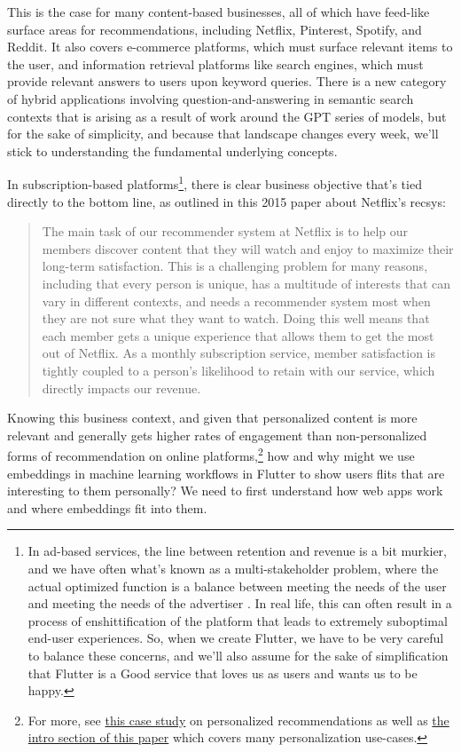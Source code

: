 \documentclass[11pt, table]{diazessay} %
\begin{document}
\begin{sloppypar}
This is the case for many content-based businesses, all of which have feed-like surface areas for recommendations, including Netflix, Pinterest, Spotify, and Reddit.  It also covers e-commerce platforms, which must surface relevant items to the user, and information retrieval platforms like search engines, which must provide relevant answers to users upon keyword queries. There is a new category of hybrid applications involving question-and-answering in semantic search contexts that is arising as a result of work around the GPT series of models, but for the sake of simplicity, and because that landscape changes every week, we'll stick to understanding the fundamental underlying concepts.

In subscription-based platforms\footnote{In ad-based services, the line between retention and revenue is a bit murkier, and we have often what's known as a multi-stakeholder problem, where the actual optimized function is a balance between meeting the needs of the user and meeting the needs of the advertiser \citep{zheng2017multi}.  In real life, this can often result in a process of enshittification \citep{doctorow_2023} of the platform that leads to extremely suboptimal end-user experiences. So, when we create Flutter, we have to be very careful to balance these concerns, and we'll also assume for the sake of simplification that Flutter is a Good service that loves us as users and wants us to be happy.}, there is clear business objective that's tied directly to the bottom line, as outlined in this 2015 paper  \citep{steck2021deep}  about Netflix's recsys:

\begin{quote}

The main task of our recommender system at Netflix is to help our members discover content that they will watch and enjoy to maximize their long-term satisfaction. This is a challenging problem for many reasons, including that every person is unique, has a multitude of interests that can vary in different contexts, and needs a recommender system most when they are not sure what they want to watch. Doing this well means that each member gets a unique experience that allows them to get the most out of Netflix. As a monthly subscription service, member satisfaction is tightly coupled to a person’s likelihood to retain with our service, which directly impacts our revenue.
\end{quote}

Knowing this business context, and given that personalized content is more relevant and generally gets higher rates of engagement \citep{jannach2010recommender} than non-personalized forms of recommendation on online platforms,\footnote{For more, see  \href{http://www.recommenderbook.net/media/Recommender_Systems_An_Introduction_Chapter08_Case_study.pdf}{this case study} on personalized recommendations as well as \href{https://www.arxiv-vanity.com/papers/1906.03109/}{the intro section of this paper} which covers many personalization use-cases.}  how and why might we use embeddings in machine learning workflows in Flutter to show users flits that are interesting to them personally? We need to first understand how web apps work and where embeddings fit into them.


\end{sloppypar}
\end{document}
